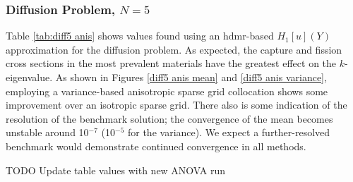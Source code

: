 \documentclass{mc2015}
\begin{document}
\subsubsection{Diffusion Problem, $N=5$}
Table \ref{tab:diff5 anis} shows values found using an hdmr-based $H_1[u](Y)$ approximation for the diffusion problem.  As expected, the capture and fission cross sections in the most prevalent materials have the greatest effect on the $k$-eigenvalue.
As shown in Figures \ref{diff5 anis mean} and \ref{diff5 anis variance}, employing a variance-based anisotropic sparse grid collocation shows some improvement over an isotropic sparse grid.  There also is some indication of the resolution of the benchmark solution; the convergence of the mean becomes unstable around 10$^{-7}$ (10$^{-5}$ for the variance).  We expect a further-resolved benchmark would demonstrate continued convergence in all methods.

TODO Update table values with new ANOVA run
\end{document}
